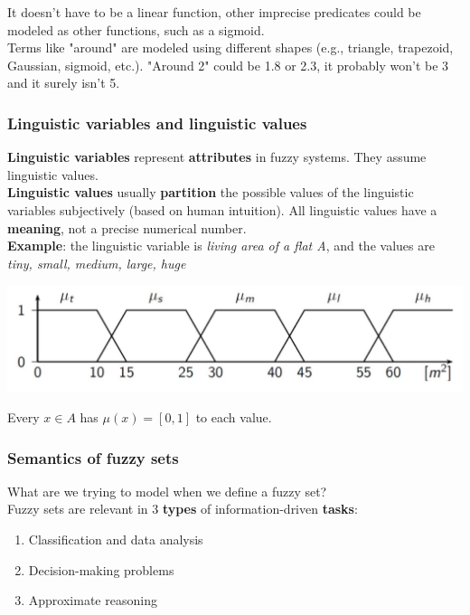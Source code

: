 It doesn't have to be a linear function, other imprecise predicates could be modeled as other functions, such as a sigmoid.\\

Terms like "around" are modeled using different shapes (e.g., triangle, trapezoid, Gaussian, sigmoid, etc.). "Around 2" could be 1.8 or 2.3, it probably won't be 3 and it surely isn't 5.\\

\newpage

\subsubsection{Linguistic variables and linguistic values}

\textbf{Linguistic variables} represent \textbf{attributes} in fuzzy systems. They assume linguistic values.\\

\textbf{Linguistic values} usually \textbf{partition} the possible values of the linguistic variables subjectively (based on human intuition). All linguistic values have a \textbf{meaning}, not a precise numerical number.\\

\textbf{Example}: the linguistic variable is \textit{living area of a flat A}, and the values are \textit{tiny, small, medium, large, huge}
\begin{center}
	\includegraphics[width=0.9\columnwidth]{img/FS/living1}
\end{center}
Every $x \in A$ has $\mu (x) = [0,1]$ to each value.\\

\newpage

\subsubsection{Semantics of fuzzy sets}

What are we trying to model when we define a fuzzy set?\\

Fuzzy sets are relevant in 3 \textbf{types} of information-driven \textbf{tasks}: 
\begin{enumerate}
	\item Classification and data analysis
	\item Decision-making problems 
	\item Approximate reasoning
\end{enumerate}

